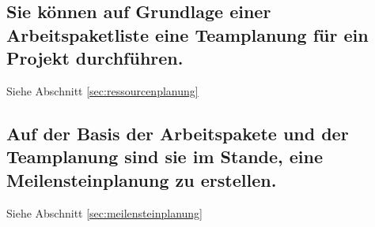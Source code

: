 \subsection{Sie können auf Grundlage einer Arbeitspaketliste eine Teamplanung für ein Projekt durchführen.}
Siehe Abschnitt \ref{sec:ressourcenplanung}

\subsection{Auf der Basis der Arbeitspakete und der Teamplanung sind sie im Stande, eine Meilensteinplanung zu erstellen.}
Siehe Abschnitt \ref{sec:meilensteinplanung}
